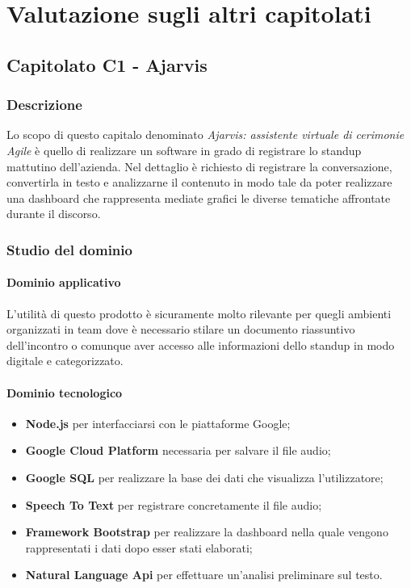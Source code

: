 \section{Valutazione sugli altri capitolati}
	\subsection{Capitolato C1 - Ajarvis}
		\subsubsection{Descrizione}
	    Lo scopo di questo capitalo denominato \emph{Ajarvis: assistente virtuale di cerimonie Agile} è quello di realizzare un software in grado di registrare lo standup mattutino dell'azienda. Nel dettaglio è richiesto di registrare la conversazione, convertirla in testo e analizzarne il contenuto in modo tale da poter realizzare una dashboard che rappresenta mediate grafici le diverse tematiche affrontate durante il discorso.  
		\subsubsection{Studio del dominio}
			\paragraph{Dominio applicativo} \Spazio
			 L'utilità di questo prodotto è sicuramente molto rilevante per quegli ambienti organizzati in team dove è necessario stilare un documento riassuntivo dell'incontro o comunque aver accesso alle informazioni dello standup in modo digitale e categorizzato.
			\paragraph{Dominio tecnologico}
			\begin{itemize}
				\item \textbf{Node.js} per interfacciarsi con le piattaforme Google;
				\item  \textbf{Google Cloud Platform} necessaria per salvare il file audio; 
				\item  \textbf{Google SQL} per realizzare la base dei dati che visualizza l'utilizzatore;
				\item  \textbf{Speech To Text} per registrare concretamente il file audio;
				\item  \textbf{Framework Bootstrap} per realizzare la dashboard nella quale vengono rappresentati i dati dopo esser stati elaborati;
				\item  \textbf{Natural Language Api} per effettuare un'analisi preliminare sul testo.	
			\end{itemize}
			
